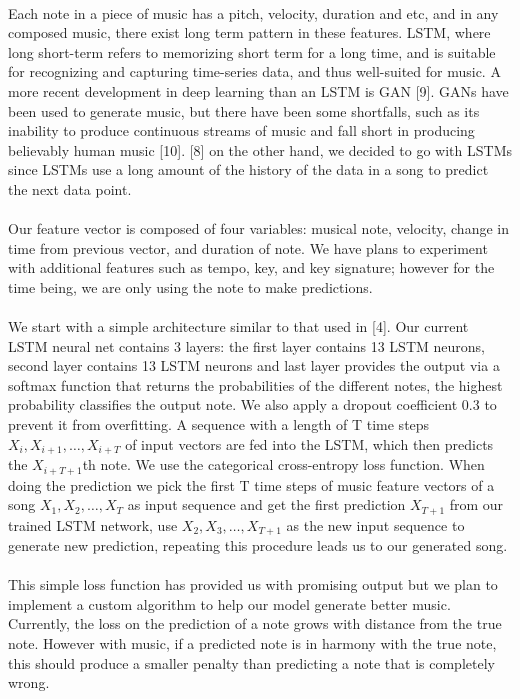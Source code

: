 \documentclass[final]{article}
\begin{document}
\paragraph{}Each note in a piece of music has a pitch, velocity, duration and etc, and in any composed music, there exist long term pattern in these features.  LSTM, where long short-term refers to memorizing short term for a long time, and is suitable for recognizing and capturing time-series data, and thus well-suited for music.  A more recent development in deep learning than an LSTM is GAN [9].  GANs have been used to generate music, but there have been some shortfalls, such as its inability to produce continuous streams of music and fall short in producing believably human music [10]. [8] on the other hand, we decided to go with LSTMs since LSTMs use a long amount of the history of the data in a song to predict the next data point.
\paragraph{}Our feature vector is composed of four variables: musical note, velocity, change in time from previous vector, and duration of note. We have plans to experiment with additional features such as tempo, key, and key signature; however for the time being, we are only using the note to make predictions.
\paragraph{}We start with a simple architecture similar to that used in [4]. Our current LSTM neural net contains 3 layers: the first layer contains 13 LSTM neurons, second layer contains 13 LSTM neurons and last layer provides the output via a softmax function that returns the probabilities of the different notes, the highest probability classifies the output note. We also apply a dropout coefficient 0.3 to prevent it from overfitting. A sequence with a length of T time steps $X_i, X_{i+1}, \dots , X_{i+T}$ of input vectors are fed into the LSTM, which then predicts the $X_{i+T+1}$th note. We use the categorical cross-entropy loss function. When doing the prediction we pick the first T time steps of music feature vectors of a song $X_1, X_2, \dots ,X_T$  as input sequence and get the first prediction $X_{T+1}$ from our trained LSTM network, use $X_2, X_3, \dots ,X_{T+1}$ as the new input sequence to generate new prediction, repeating this procedure leads us to our generated song.   
\paragraph{}This simple loss function has provided us with promising output but we plan to implement a custom algorithm to help our model generate better music.  Currently, the loss on the prediction of a note grows with distance from the true note.  However with music, if a predicted note is in harmony with the true note, this should produce a smaller penalty than predicting a note that is completely wrong.
\end{document}

